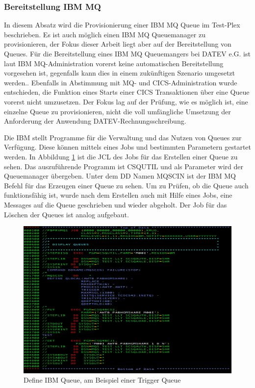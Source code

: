 \subsubsection{Bereitstellung IBM MQ}\label{sssec:mqtplx}
In diesem Absatz wird die Provisionierung einer IBM MQ Queue im Test-Plex beschrieben. 
Es ist auch möglich einen IBM MQ Queuemanager zu provisionieren, der Fokus dieser Arbeit liegt aber auf der Bereitstellung von Queues. 
Für die Bereitstellung eines IBM MQ Queuemangers bei DATEV e.G. ist laut IBM MQ-Administration vorerst keine automatischen Bereitstellung vorgesehen ist, gegenfalls kann dies in einem zukünftigen Szenario umgesetzt werden..
Ebenfalls in Abstimmung mit MQ- und CICS-Administration wurde entschieden, die Funktion eines Starts einer CICS Transaktionen über eine Queue vorerst nicht umzusetzen. Der Fokus lag auf der Prüfung, wie es möglich ist, eine einzelne Queue zu provisionieren, nicht die voll umfängliche Umsetzung der Anforderung der Anwendung DATEV-Rechnungsschreibung. 

Die IBM stellt Programme für die Verwaltung und das Nutzen von Queues  zur Verfügung.
Diese können mittels eines Jobs und bestimmten Parametern gestartet werden.
In Abbildung \ref{code:defq} ist die JCL des Jobs für das Erstellen einer Queue zu sehen.
Das auszuführende Programm ist \glqq CSQUTIL\grqq{} und als Parameter wird der Queuemanager übergeben.
Unter dem DD Namen \glqq MQSCIN\grqq{} ist der IBM MQ Befehl für das Erzeugen einer Queue zu sehen.
Um zu Prüfen, ob die Queue auch funktionsfähig ist, wurde nach dem Erstellen auch mit Hilfe eines Jobs, eine Messages auf die Queue geschrieben und wieder abgeholt.
Der Job für das Löschen der Queues ist analog aufgebaut.

\begin{figure}[h]
	\centering
	\includegraphics[width=\textwidth]{figures/defqjcl.PNG}
	\caption{Define IBM Queue, am Beispiel einer Trigger Queue}
	\label{code:defq}
\end{figure}

